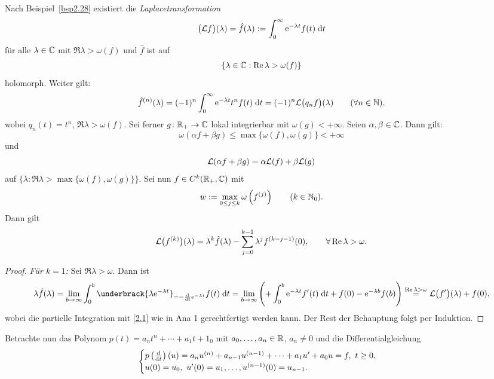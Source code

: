 \documentclass[a4paper,twoside,DIV15,BCOR12mm]{scrbook}
\begin{document}
Nach Beispiel~\ref{bsp2.28} existiert die \textit{Laplacetransformation}
\[\bigl(\mathcal{L} f\bigr)(\lambda) = \hat{f}(\lambda):=\int_{0}^{\infty}{\mathrm{e}^{-\lambda t}f(t)}\;\mathrm{d} t\]
für alle $\lambda\in\mathbb{C}$ mit $\Re{\lambda}>\omega(f)$ und $\hat{f}$ ist auf
\[\{\lambda\in\mathbb{C}: \operatorname{Re}{\lambda}>\omega(f)\}\]
holomorph. Weiter gilt:
\begin{equation}\label{4.1}
\hat{f}^{(n)}(\lambda) = (-1)^n\int_{0}^{\infty}{\mathrm{e}^{-\lambda t}t^nf(t)}\;\mathrm{d} t = (-1)^n\mathcal{L}\bigl(q_nf\bigr)(\lambda)\qquad(\forall n\in\mathbb{N}),
\end{equation}
wobei $q_n(t) = t^n$, $\Re{\lambda}>\omega(f)$. Sei ferner $g\colon\mathbb{R}_+\to\mathbb{C}$ lokal integrierbar mit $\omega(g)<+\infty$. Seien $\alpha, \beta\in\mathbb{C}$. Dann gilt:
\[\omega(\alpha f+\beta g)\leq\max\{\omega(f),\omega(g)\}<+\infty\]
und
\begin{equation}\label{4.2}
\mathcal{L}(\alpha f+\beta g) = \alpha\mathcal{L}(f)+\beta\mathcal{L}(g)
\end{equation}
auf $\{\lambda:\Re{\lambda}>\max\{\omega(f),\omega(g)\}\}$. Sei nun $f\in C^k(\mathbb{R}_+,\mathbb{C})$ mit
\[w:=\max_{0\leq j\leq k}\omega\left(f^{(j)}\right)\qquad(k\in\mathbb{N}_0).\]
Dann gilt
\begin{equation}\label{4.3}
\mathcal{L}\bigl(f^{(k)}\bigr)(\lambda) = \lambda^k\hat{f}(\lambda)-\sum_{j=0}^{k-1}\lambda^jf^{(k-j-1)}(0),\qquad\forall\operatorname{Re}{\lambda}>\omega.
\end{equation}
\begin{proof}\textit{Für $k=1$:} Sei $\Re{\lambda}>\omega$. Dann ist
\[\lambda\hat{f}(\lambda)=\lim_{b\to\infty}\integral{0}{b}{\underbrack{\lambda\e^{-\lambda t}}_{=-\frac{\d}{\d t}\e^{-\lambda t}}f(t)}{t}=\lim_{b\to\infty}\left(+\integral{0}{b}{\e^{-\lambda t}f^\prime(t)}{t} + f(0) - \e^{-\lambda b}f(b)\right) \overset{\Re{\lambda}>\omega}{=} \L\bigl(f^\prime\bigr)(\lambda) + f(0),\]
wobei die partielle Integration mit \eqref{2.1} wie in Ana 1 gerechtfertigt werden kann. Der Rest der Behauptung folgt per Induktion.
\end{proof}

Betrachte nun das Polynom $p(t)=a_nt^n+\dotsb+a_1t+1_0$ mit $a_0,\dotsc,a_n\in\mathbb{R}$, $a_n\neq 0$ und die Differentialgleichung
\begin{equation}\label{4.4}
\begin{cases}
p\left(\frac{\mathrm{d}}{\mathrm{d} t}\right)(u) = a_nu^{(n)}+a_{n-1}u^{(n-1)}+\dotsb+a_1u^\prime+a_0u = f,\ t\geq 0,\\
u(0)=u_0,\ u^\prime(0) = u_1,\dotsc,u^{(n-1)}(0) = u_{n-1}.
\end{cases}
\end{equation}
\end{document}
